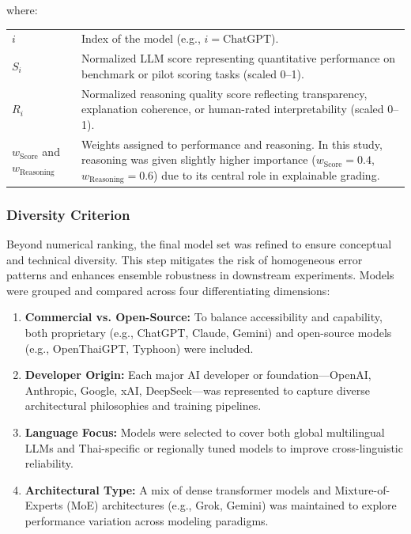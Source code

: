 where:

\begin{longtable}{l p{}}
    \( i \) & Index of the model (e.g., \( i = \text{ChatGPT} \)). \\
    \( S_i \) & Normalized LLM score representing quantitative performance on benchmark or pilot scoring tasks (scaled 0–1). \\
    \( R_i \) & Normalized reasoning quality score reflecting transparency, explanation coherence, or human-rated interpretability (scaled 0–1). \\
    \( w_{\text{Score}} \) and \( w_{\text{Reasoning}} \) & Weights assigned to performance and reasoning.  
    In this study, reasoning was given slightly higher importance (\( w_{\text{Score}} = 0.4 \), \( w_{\text{Reasoning}} = 0.6 \)) due to its central role in explainable grading. \\
\end{longtable}

\subsubsection{Diversity Criterion}

Beyond numerical ranking, the final model set was refined 
to ensure conceptual and technical diversity. This step mitigates 
the risk of homogeneous error patterns and enhances ensemble 
robustness in downstream experiments. Models were grouped 
and compared across four differentiating dimensions:

\begin{enumerate}
    \item \textbf{Commercial vs. Open-Source:}  
    To balance accessibility and capability, both proprietary (e.g., ChatGPT, Claude, Gemini) and open-source models (e.g., OpenThaiGPT, Typhoon) were included.

    \item \textbf{Developer Origin:}  
    Each major AI developer or foundation—OpenAI, Anthropic, Google, xAI, DeepSeek—was represented to capture diverse architectural philosophies and training pipelines.

    \item \textbf{Language Focus:}  
    Models were selected to cover both global multilingual LLMs and Thai-specific or regionally tuned models to improve cross-linguistic reliability.

    \item \textbf{Architectural Type:}  
    A mix of dense transformer models and Mixture-of-Experts (MoE) architectures (e.g., Grok, Gemini) was maintained to explore performance variation across modeling paradigms.
\end{enumerate}

